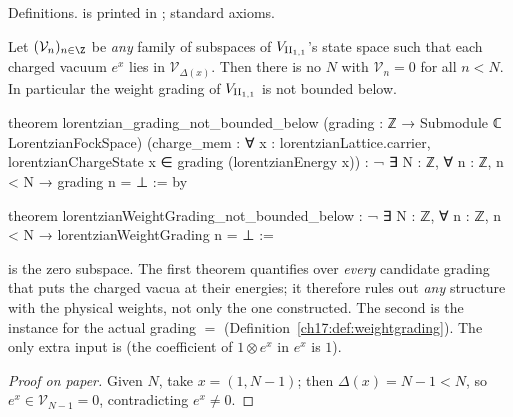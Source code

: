 \begin{status}
Definitions.   is printed in
; standard axioms.
\end{status}

\begin{theorem}\label{ch17:thm:notbounded}
Let $(\mathcal V_n)_{n\in\Z}$ be \emph{any} family of subspaces of ${V_{\mathrm{II}_{1,1}}}$'s state space such that each
charged vacuum $e^x$ lies in $\mathcal V_{\Delta(x)}$.  Then there is no $N$ with $\mathcal V_n=0$ for all $n<N$.
In particular the weight grading of ${V_{\mathrm{II}_{1,1}}}$ is not bounded below.
\end{theorem}

\begin{leancode}
theorem lorentzian_grading_not_bounded_below
    (grading : ℤ → Submodule ℂ LorentzianFockSpace)
    (charge_mem : ∀ x : lorentzianLattice.carrier,
      lorentzianChargeState x ∈ grading (lorentzianEnergy x)) :
    ¬ ∃ N : ℤ, ∀ n : ℤ, n < N → grading n = ⊥ := by

theorem lorentzianWeightGrading_not_bounded_below :
    ¬ ∃ N : ℤ, ∀ n : ℤ, n < N → lorentzianWeightGrading n = ⊥ :=
\end{leancode}

\begin{dictionary}
 is the zero subspace.  The first theorem quantifies over \emph{every} candidate grading that puts
the charged vacua at their energies; it therefore rules out \emph{any} 
structure with the physical weights, not only the one constructed.  The second is the instance for the
actual grading  $=$ 
(Definition~\ref{ch17:def:weightgrading}).  The only extra input is 
(the coefficient of $1\otimes e^x$ in $e^x$ is $1$).
\end{dictionary}

\begin{proof}[Proof on paper]
Given $N$, take $x=(1,N-1)$; then $\Delta(x)=N-1<N$, so $e^x\in\mathcal V_{N-1}=0$, contradicting $e^x\neq0$.
\end{proof}

